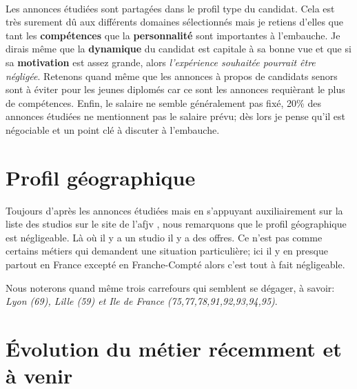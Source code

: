 \documentclass[12pt, a4paper]{report} %
\begin{document}
\paragraph{}
Les annonces étudiées sont partagées dans le profil type du candidat. Cela est très surement dû aux différents domaines sélectionnés mais je retiens d'elles que tant les \textbf{compétences} que la \textbf{personnalité} sont importantes à l'embauche. Je dirais même que la \textbf{dynamique} du candidat est capitale à sa bonne vue et que si sa \textbf{motivation} est assez grande, alors \emph{l'expérience souhaitée pourrait être négligée}. Retenons quand même que les annonces à propos de candidats senors sont à éviter pour les jeunes diplomés car ce sont les annonces requièrant le plus de compétences. Enfin, le salaire ne semble généralement pas fixé, 20\%{} des annonces étudiées  ne mentionnent pas le salaire prévu; dès lors je pense qu'il est négociable et un point clé à discuter à l'embauche.

\section{Profil géographique}
Toujours d'après les annonces étudiées mais en s'appuyant auxiliairement sur la liste des studios sur le site de l'\acrshort{afjv} \cite{afjvls}, nous remarquons que le profil géographique est négligeable. Là où il y a un studio il y a des offres. Ce n'est pas comme certains métiers  qui demandent une situation particulière; ici il y en presque partout en France excepté en Franche-Compté  alors c'est tout à fait négligeable.

Nous noterons quand même trois carrefours qui semblent se dégager, à savoir: \emph{Lyon (69), Lille (59) et  Ile de France (75,77,78,91,92,93,94,95)}. 

\section{Évolution du métier récemment et à venir}
\end{document}
